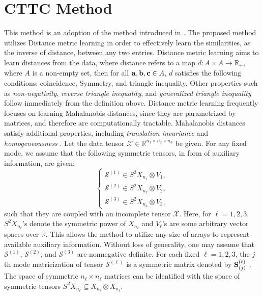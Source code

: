 \documentclass{article}
\newcommand{\T}{\mathcal}
\newcommand{\m}[1]{{\bf{#1}}}
\newcommand{\mb}[1]{{\mathbb{#1}}}
\begin{document}
\section{CTTC Method}\label{sec:MF}

\label{sec:cttc} 
This method is an adoption of the method introduced in \cite{bagherian2026algebraic}. The proposed method utilizes Distance metric learning in order to effectively learn the similarities, as the inverse of distance, between any two entries. Distance metric learning \cite{suarez2018tutorial} aims to learn distances from the data, where distance refers to a map $d:A\times A\to \mb R_+$, where $A$ is a non-empty set, then for all $\m a, \m b, \m c\in A$, $d$ satisfies the following conditions: coincidence,  Symmetry, and triangle inequality.
Other properties such as \emph{non-negativity}, \emph{reverse triangle inequality}, and \emph{generalized triangle inequality} follow immediately from the definition above. 
Distance metric learning frequently focuses on learning Mahalanobis distances, since they
are parametrized by matrices, and therefore are computationally tractable. Mahalanobis distances satisfy additional properties, including \emph{translation invariance} and \emph{homogeneousness} \cite{suarez2018tutorial}.
Let the data tensor $\T X\in  \mb R^{n_1\times n_2\times n_3}$ be given. For any fixed mode, we assume that
the following symmetric tensors, in form of auxiliary information, are given:
\begin{equation}
    \begin{cases}
    \T S^{(1)}\in S^2X_{n_1}\otimes V_1, \\
    \T S^{(2)}\in S^2X_{n_2}\otimes V_2,\\
    \T S^{(3)}\in S^2X_{n_3}\otimes V_3,
    \end{cases}
\end{equation} 
such that they are coupled with an incomplete tensor $\T X$. Here, for $\ell=1,2,3,$ $S^2X_{n_\ell}$'s denote the symmetric power of $X_{n_\ell}$ and $V_\ell$'s are some arbitrary vector spaces over $\mb R$. This allows the method to utilize any size of arrays to represent available auxiliary information.
Without loss of generality, one may assume that $\T S^{(1)}$, $\T S^{(2)}$, and $\T S^{(3)}$ are nonnegative definite. For each fixed $\ell=1,2,3$, the $j$th mode matricization of tensor $\T S^{(\ell)}$ is a symmetric matrix denoted by $\m S^{(\ell)}_{(j)}$ .
The space of symmetric $n_\ell\times n_\ell$ matrices can be identified with the space
of symmetric tensors $S^2X_{n_\ell}\subseteq X_{n_\ell}\otimes X_{n_\ell}$. 
\end{document}
